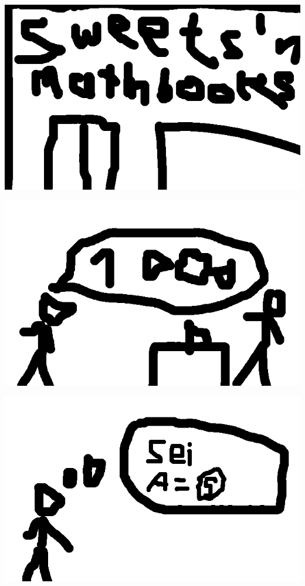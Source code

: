 \documentclass{beamer}
\begin{document}
\begin{frame}
  \includegraphics[width=\framewidth]{comic3.png}
\end{frame}
\begin{frame}
  \includegraphics[width=\framewidth]{comic4.png}
\end{frame}
\begin{frame}
  \includegraphics[width=\framewidth]{comic5.png}
\end{frame}
\end{document}
